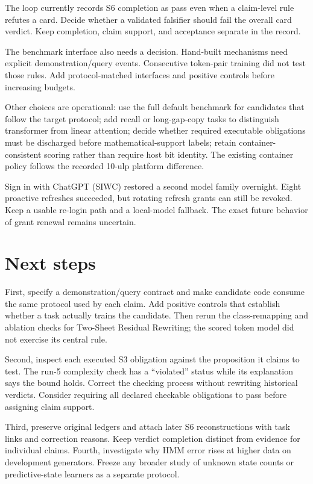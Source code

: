 The loop currently records S6 completion as pass even when a claim-level rule refutes a card. Decide whether a validated falsifier should fail the overall card verdict. Keep completion, claim support, and acceptance separate in the record.

The benchmark interface also needs a decision. Hand-built mechanisms need explicit demonstration/query events. Consecutive token-pair training did not test those rules. Add protocol-matched interfaces and positive controls before increasing budgets.

Other choices are operational: use the full default benchmark for candidates that follow the target protocol; add recall or long-gap-copy tasks to distinguish transformer from linear attention; decide whether required executable obligations must be discharged before mathematical-support labels; retain container-consistent scoring rather than require host bit identity. The existing container policy follows the recorded 10-ulp platform difference.

Sign in with ChatGPT (SIWC) restored a second model family overnight. Eight proactive refreshes succeeded, but rotating refresh grants can still be revoked. Keep a usable re-login path and a local-model fallback. The exact future behavior of grant renewal remains uncertain.

\section{Next steps}

First, specify a demonstration/query contract and make candidate code consume the same protocol used by each claim. Add positive controls that establish whether a task actually trains the candidate. Then rerun the class-remapping and ablation checks for Two-Sheet Residual Rewriting; the scored token model did not exercise its central rule.

Second, inspect each executed S3 obligation against the proposition it claims to test. The run-5 complexity check has a ``violated'' status while its explanation says the bound holds. Correct the checking process without rewriting historical verdicts. Consider requiring all declared checkable obligations to pass before assigning claim support.

Third, preserve original ledgers and attach later S6 reconstructions with task links and correction reasons. Keep verdict completion distinct from evidence for individual claims. Fourth, investigate why HMM error rises at higher data on development generators. Freeze any broader study of unknown state counts or predictive-state learners as a separate protocol.

